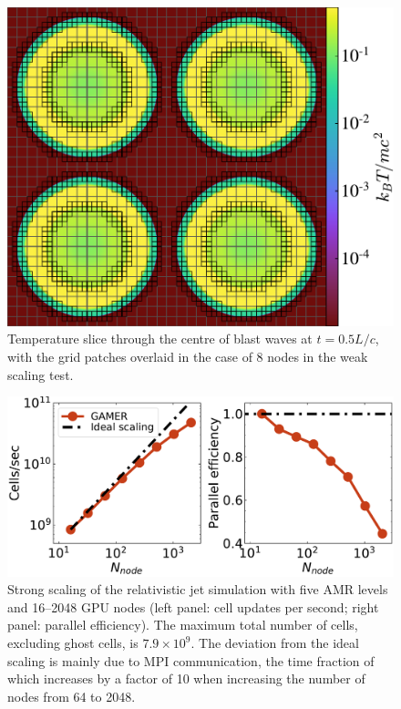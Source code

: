 \begin{figure}
\includegraphics[width=\columnwidth]{figures/fig__weak_scaling.pdf}
\centering
\caption{Temperature slice through the centre of blast waves at $t=0.5L/c$, with the grid patches overlaid in the case of 8 nodes in the weak scaling test.}
\label{fig:multi-blast waves}
\end{figure}

\begin{figure}
\includegraphics[width=\columnwidth]{figures/fig__benchmark_strongscaling.pdf}
\caption{Strong scaling of the relativistic jet simulation with five AMR levels and 16--2048 GPU nodes (left panel: cell updates per second; right panel: parallel efficiency). The maximum total number of cells, excluding ghost cells, is $7.9\times 10^{9}$. The deviation from the ideal scaling is mainly due to MPI communication, the time fraction of which increases by a factor of 10 when increasing the number of nodes from 64 to 2048.}
\label{fig:strong scaling}
\end{figure}

